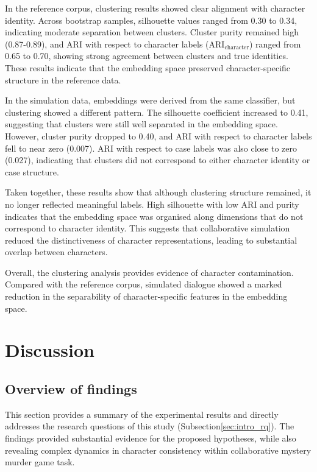 \documentclass{article}
\begin{document}
In the reference corpus, clustering results showed clear alignment with character identity. Across bootstrap samples, silhouette values ranged from 0.30 to 0.34, indicating moderate separation between clusters. Cluster purity remained high (0.87-0.89), and ARI with respect to character labels ($\mathrm{ARI_{character}}$) ranged from 0.65 to 0.70, showing strong agreement between clusters and true identities. These results indicate that the embedding space preserved character-specific structure in the reference data.

In the simulation data, embeddings were derived from the same classifier, but clustering showed a different pattern. The silhouette coefficient increased to 0.41, suggesting that clusters were still well separated in the embedding space. However, cluster purity dropped to 0.40, and ARI with respect to character labels fell to near zero (0.007). ARI with respect to case labels was also close to zero (0.027), indicating that clusters did not correspond to either character identity or case structure.

Taken together, these results show that although clustering structure remained, it no longer reflected meaningful labels. High silhouette with low ARI and purity indicates that the embedding space was organised along dimensions that do not correspond to character identity. This suggests that collaborative simulation reduced the distinctiveness of character representations, leading to substantial overlap between characters.

Overall, the clustering analysis provides evidence of character contamination. Compared with the reference corpus, simulated dialogue showed a marked reduction in the separability of character-specific features in the embedding space.


\section{Discussion} \label{sec:discussion}

\subsection{Overview of findings}

This section provides a summary of the experimental results and directly addresses the research questions of this study (Subsection\ref{sec:intro_rq}). The findings provided substantial evidence for the proposed hypotheses, while also revealing complex dynamics in character consistency within collaborative mystery murder game task.
\end{document}
